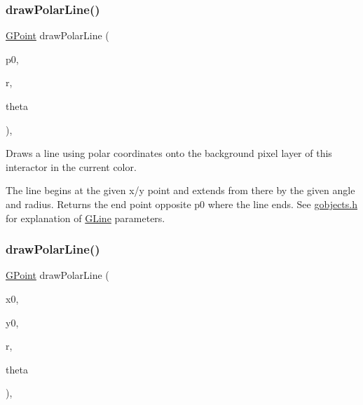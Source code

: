\mbox{\label{classGDrawingSurface_af70cce1e4f708f1ed5b6f29cecb660e7}} 
\subsubsection{\texorpdfstring{draw\+Polar\+Line()}{drawPolarLine()}\hspace{0.1cm}{\footnotesize\ttfamily [1/2]}}
{\footnotesize\ttfamily \mbox{\hyperlink{classGPoint}{G\+Point}} draw\+Polar\+Line (\begin{DoxyParamCaption}\item[{const \mbox{\hyperlink{classGPoint}{G\+Point}} \&}]{p0,  }\item[{double}]{r,  }\item[{double}]{theta }\end{DoxyParamCaption})\hspace{0.3cm}{\ttfamily [virtual]}, {\ttfamily [inherited]}}



Draws a line using polar coordinates onto the background pixel layer of this interactor in the current color. 

The line begins at the given x/y point and extends from there by the given angle and radius. Returns the end point opposite p0 where the line ends. See \mbox{\hyperlink{gobjects_8h_source}{gobjects.\+h}} for explanation of \mbox{\hyperlink{classGLine}{G\+Line}} parameters. \mbox{\label{classGDrawingSurface_ad3e646f90005295f2bbdf37d2bcb39d2}} 
\subsubsection{\texorpdfstring{draw\+Polar\+Line()}{drawPolarLine()}\hspace{0.1cm}{\footnotesize\ttfamily [2/2]}}
{\footnotesize\ttfamily \mbox{\hyperlink{classGPoint}{G\+Point}} draw\+Polar\+Line (\begin{DoxyParamCaption}\item[{double}]{x0,  }\item[{double}]{y0,  }\item[{double}]{r,  }\item[{double}]{theta }\end{DoxyParamCaption})\hspace{0.3cm}{\ttfamily [virtual]}, {\ttfamily [inherited]}}



